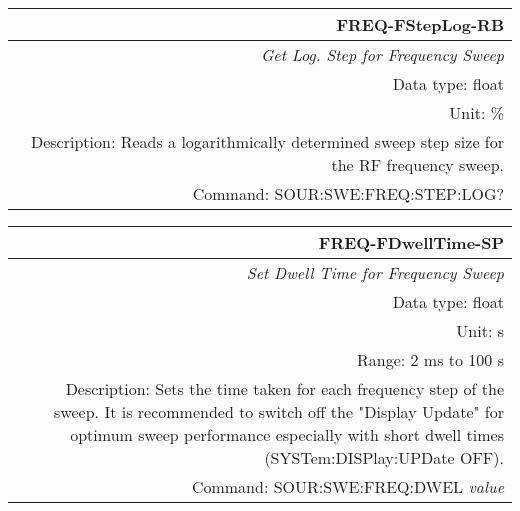 \documentclass[openany]{article}
\begin{document}
		\begin{tabular}{N}
			\hline
			\bfseries FREQ-FStepLog-RB \\ \hline
			\emph{Get Log. Step for Frequency Sweep} \\
			Data type: float \\
			Unit: \% \\
			Description: Reads a logarithmically determined sweep step size for the RF frequency sweep. \\
			Command: SOUR:SWE:FREQ:STEP:LOG? \\

		\end{tabular}
%
		\begin{tabular}{N}
			\hline
			\bfseries FREQ-FDwellTime-SP \\ \hline
			\emph{Set Dwell Time for Frequency Sweep} \\
			Data type: float \\
			Unit: s \\
			Range: 2 ms to 100 s \\
			Description: Sets the time taken for each frequency step of the sweep. It is recommended to switch off the "Display Update" for optimum sweep performance especially with short dwell times (SYSTem:DISPlay:UPDate OFF). \\
			Command: SOUR:SWE:FREQ:DWEL \emph{value} \\
			
		\end{tabular}
\end{document}
